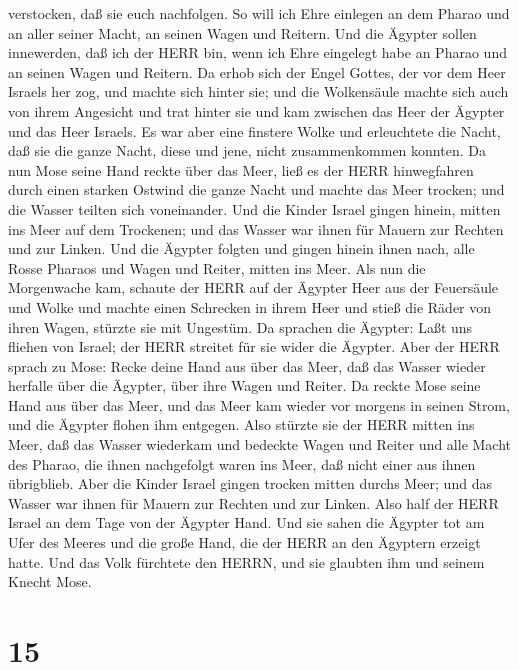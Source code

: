 verstocken, daß sie euch nachfolgen. So will ich Ehre einlegen an dem
Pharao und an aller seiner Macht, an seinen Wagen und Reitern.
 Und die Ägypter sollen innewerden, daß ich der HERR bin,
wenn ich Ehre eingelegt habe an Pharao und an seinen Wagen und Reitern.
 Da erhob sich der Engel Gottes, der vor dem Heer Israels
her zog, und machte sich hinter sie; und die Wolkensäule machte sich
auch von ihrem Angesicht und trat hinter sie  und kam
zwischen das Heer der Ägypter und das Heer Israels. Es war aber eine
finstere Wolke und erleuchtete die Nacht, daß sie die ganze Nacht, diese
und jene, nicht zusammenkommen konnten.  Da nun Mose seine
Hand reckte über das Meer, ließ es der HERR hinwegfahren durch einen
starken Ostwind die ganze Nacht und machte das Meer trocken; und die
Wasser teilten sich voneinander.  Und die Kinder Israel
gingen hinein, mitten ins Meer auf dem Trockenen; und das Wasser war
ihnen für Mauern zur Rechten und zur Linken.  Und die
Ägypter folgten und gingen hinein ihnen nach, alle Rosse Pharaos und
Wagen und Reiter, mitten ins Meer.  Als nun die Morgenwache
kam, schaute der HERR auf der Ägypter Heer aus der Feuersäule und Wolke
und machte einen Schrecken in ihrem Heer  und stieß die
Räder von ihren Wagen, stürzte sie mit Ungestüm. Da sprachen die
Ägypter: Laßt uns fliehen von Israel; der HERR streitet für sie wider
die Ägypter.  Aber der HERR sprach zu Mose: Recke deine
Hand aus über das Meer, daß das Wasser wieder herfalle über die Ägypter,
über ihre Wagen und Reiter.  Da reckte Mose seine Hand aus
über das Meer, und das Meer kam wieder vor morgens in seinen Strom, und
die Ägypter flohen ihm entgegen. Also stürzte sie der HERR mitten ins
Meer,  daß das Wasser wiederkam und bedeckte Wagen und
Reiter und alle Macht des Pharao, die ihnen nachgefolgt waren ins Meer,
daß nicht einer aus ihnen übrigblieb.  Aber die Kinder
Israel gingen trocken mitten durchs Meer; und das Wasser war ihnen für
Mauern zur Rechten und zur Linken.  Also half der HERR
Israel an dem Tage von der Ägypter Hand. Und sie sahen die Ägypter tot
am Ufer des Meeres  und die große Hand, die der HERR an den
Ägyptern erzeigt hatte. Und das Volk fürchtete den HERRN, und sie
glaubten ihm und seinem Knecht Mose.

\hypertarget{section-14}{%
\section{15}\label{section-14}}

